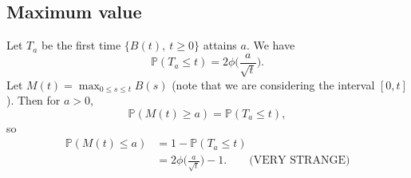 \subsection{Maximum value }

Let $T_a$ be the first time $\{ B(t), \ t \geq 0 \}$ attains $a$. We have
    $$ \mathbb{P}(T_a \leq t) = 2 \phi \biggl( \frac{a}{\sqrt{t}} \biggr) . $$
Let $M(t) = \max_{0 \leq s \leq t} B(s)$ (note that we are considering the interval $[0, t]$). Then for $a > 0$,
    $$ \mathbb{P}(M(t) \geq a) = \mathbb{P}(T_a \leq t) , $$
so
    \begin{align*}
        \mathbb{P}(M(t) \leq a) &= 1 - \mathbb{P}(T_a \leq t) \\
        &= 2\phi \biggl( \frac{a}{\sqrt{t}} \biggr) - 1 . \qquad \text{(VERY STRANGE)}
    \end{align*}

